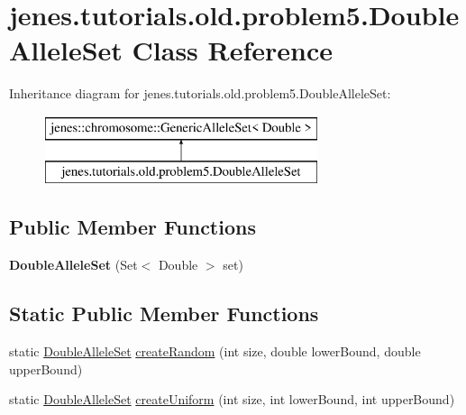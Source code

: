 \hypertarget{classjenes_1_1tutorials_1_1old_1_1problem5_1_1_double_allele_set}{\section{jenes.\-tutorials.\-old.\-problem5.\-Double\-Allele\-Set Class Reference}
\label{classjenes_1_1tutorials_1_1old_1_1problem5_1_1_double_allele_set}
}
Inheritance diagram for jenes.\-tutorials.\-old.\-problem5.\-Double\-Allele\-Set\-:\begin{figure}[H]
\begin{center}
\leavevmode
\includegraphics[height=2.000000cm]{classjenes_1_1tutorials_1_1old_1_1problem5_1_1_double_allele_set}
\end{center}
\end{figure}
\subsection*{Public Member Functions}
\begin{DoxyCompactItemize}
\item 
\hypertarget{classjenes_1_1tutorials_1_1old_1_1problem5_1_1_double_allele_set_a16cde300bda10dc1ce20aa354514ad55}{{\bfseries Double\-Allele\-Set} (Set$<$ Double $>$ set)}\label{classjenes_1_1tutorials_1_1old_1_1problem5_1_1_double_allele_set_a16cde300bda10dc1ce20aa354514ad55}

\end{DoxyCompactItemize}
\subsection*{Static Public Member Functions}
\begin{DoxyCompactItemize}
\item 
static \hyperlink{classjenes_1_1tutorials_1_1old_1_1problem5_1_1_double_allele_set}{Double\-Allele\-Set} \hyperlink{classjenes_1_1tutorials_1_1old_1_1problem5_1_1_double_allele_set_ab055f13f0aade5cd9bf21a42a6c00f67}{create\-Random} (int size, double lower\-Bound, double upper\-Bound)
\item 
static \hyperlink{classjenes_1_1tutorials_1_1old_1_1problem5_1_1_double_allele_set}{Double\-Allele\-Set} \hyperlink{classjenes_1_1tutorials_1_1old_1_1problem5_1_1_double_allele_set_af442b73be0657db17a35d7fb376a98ed}{create\-Uniform} (int size, int lower\-Bound, int upper\-Bound)
\end{DoxyCompactItemize}


